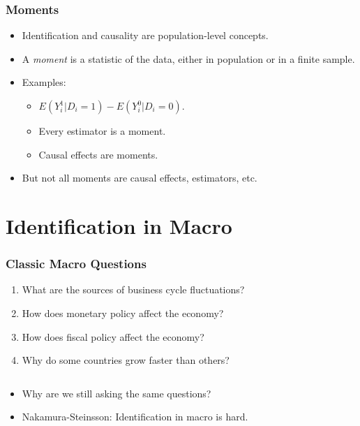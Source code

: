 \documentclass[english,xcolor=svgnames]{beamer}
\begin{document}
\begin{frame}
\frametitle[alignment=center]{Moments}
\begin{itemize}
	\item Identification and causality are population-level concepts.
	\item A \emph{moment} is a statistic of the data, either in population or in a finite sample. 
	\item Examples:
	\begin{itemize}
		\item $E(Y_i^1 | D_i=1 ) - E(Y_i^0 | D_i=0 )$.
		\item Every estimator is a moment.
		\item Causal effects are moments.
	\end{itemize}
	\item But not all moments are causal effects, estimators, etc.
\end{itemize}
\end{frame}



\section{Identification in Macro}


\begin{frame}
\frametitle[alignment=center]{Classic Macro Questions}
\begin{enumerate}
	\item What are the sources of business cycle fluctuations? 
	\item How does monetary policy affect the economy? 
	\item How does fiscal policy affect the economy? 
	\item Why do some countries grow faster than others? 
\end{enumerate}
$\;$
\begin{itemize}
	\item Why are we still asking the same questions? 
	\item Nakamura-Steinsson: Identification in macro is hard.
\end{itemize}
\end{frame}
\end{document}
